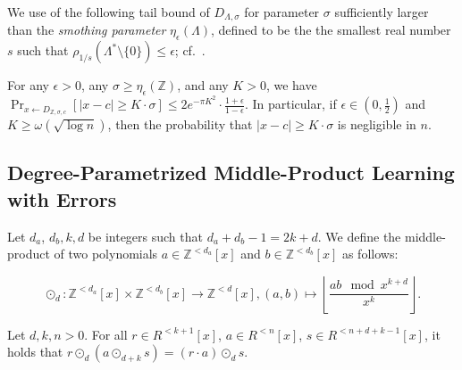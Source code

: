 \documentclass[runningheads]{llncs}
\def\Z{\mathbb{Z}}
\begin{document}
We use of the following tail bound of $D_{\Lambda,\sigma}$ for parameter $\sigma$ 
sufficiently larger than the {\it smothing parameter} $\eta_\epsilon(\Lambda)$, defined to be the the smallest real number $s$ such that $\rho_{1/s}(\Lambda^{*}\setminus\{0\})\leq \epsilon$; cf.~\cite{MR07}.

\begin{lemma} \label{lem4}
	For any $\epsilon>0$, any $\sigma \geq \eta_{\epsilon}(\mathbb{Z})$, and any $K>0$, we have
	$\Pr_{x\leftarrow D_{\mathbb{Z},\sigma, c}}[\vert x-c\vert\geq K\cdot \sigma] \leq 2 e^{-\pi K^2}\cdot \frac{1+\epsilon}{1-\epsilon}.$
	In particular, if $\epsilon \in (0, \frac{1}{2})$ and $K \geq \omega(\sqrt{\log n})$,
	 then the probability that $|x-c|\geq K\cdot\sigma$ is negligible in $n$.
\end{lemma}







\subsection{Degree-Parametrized Middle-Product Learning with Errors}


\begin{definition} Let $d_a$, $d_b,k,d$ be integers such that $d_a+d_b-1=2k+d$. We define the middle-product of two polynomials $a \in \Z^{<d_a}[x]$ and $b \in \Z^{<d_b}[x]$ as follows: 
\end{definition}
\begin{equation}\label{eq11}
\odot_d:  \Z^{<d_a}[x] \times \Z^{<d_b}[x] \rightarrow \Z^{<d}[x], 
(a,b) \mapsto \left\lfloor \frac{ab\mod x^{k+d}}{x^k} \right \rfloor.
\end{equation}



\begin{lemma} \label{lem3}
Let $d, k, n>0$. For all $r \in R^{<k+1}[x]$, $a\in R^{<n}[x]$, $s \in R^{<n+d+k-1}[x]$, it holds that
$r\odot_d(a \odot_{d+k}s)=(r\cdot a)\odot_{d}s. $
\end{lemma}
\end{document}
